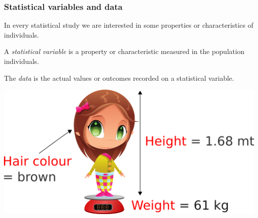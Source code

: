 \begin{frame}
\frametitle{Statistical variables and data}
In every statistical study we are interested in some properties or characteristics of individuals.
\begin{definition}
A \emph{statistical variable} is a property or characteristic measured in the population individuals.

The \emph{data} is the actual values or outcomes recorded on a statistical variable.
\end{definition}

\begin{center}
\includegraphics[scale=0.5]{img/introduction/statistical_variables.png}
\end{center}
\end{frame}


